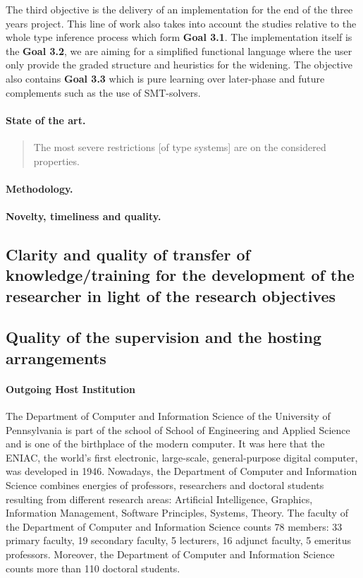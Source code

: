 \documentclass{article}[11pt]
\begin{document}
 The third objective is the delivery of an implementation for the end of the three years project. This line of work also takes into account the studies relative to the whole type inference process which form {\bf Goal 3.1}. The implementation itself is the {\bf Goal 3.2}, we are aiming for a simplified functional language where the user only provide the graded structure and heuristics for the widening. The objective also contains {\bf Goal 3.3} which is pure learning over later-phase and future complements such as the use of SMT-solvers.


\paragraph{State of the art.}

\begin{quote}
  The most severe restrictions [of type systems] are on the considered properties.
\end{quote}


\paragraph{Methodology.}

\paragraph{Novelty, timeliness and quality.}

\subsection{Clarity and quality of transfer of knowledge/training for the development of the researcher in light of the research objectives}

\subsection{Quality of the supervision and the hosting arrangements}
\paragraph{Outgoing Host Institution}
The Department of Computer and Information Science of the University of Pennsylvania is part of the
school of School of Engineering and Applied Science and is one of the birthplace of the modern
computer. It was here that the ENIAC, the world's first electronic, large-scale, general-purpose
digital computer, was developed in 1946. Nowadays, the Department of Computer and
Information Science combines energies of professors, researchers and doctoral students resulting
from different research areas: Artificial Intelligence, Graphics, Information Management,
Software Principles, Systems, Theory. The faculty of the Department of Computer and
Information Science counts 78 members: 33 primary faculty, 19 secondary faculty, 5 lecturers, 16
adjunct faculty, 5 emeritus professors. Moreover, the Department of Computer and Information
Science counts more than 110 doctoral students.
\end{document}
